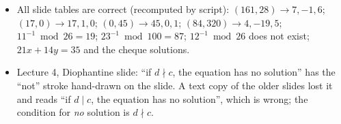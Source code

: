 \begin{fixbox}
\begin{itemize}
  \item All slide tables are correct (recomputed by script): $(161, 28) \to 7, -1, 6$; $(17, 0) \to 17, 1, 0$; $(0, 45) \to 45, 0, 1$; $(84, 320) \to 4, -19, 5$; $11^{-1} \bmod 26 = 19$; $23^{-1} \bmod 100 = 87$; $12^{-1} \bmod 26$ does not exist; $21x + 14y = 35$ and the cheque solutions.
  \item Lecture 4, Diophantine slide: ``if $d \nmid c$, the equation has no solution'' has the ``not'' stroke hand-drawn on the slide. A text copy of the older slides lost it and reads ``if $d \mid c$, the equation has no solution'', which is wrong; the condition for \emph{no} solution is $d \nmid c$.
\end{itemize}
\end{fixbox}
